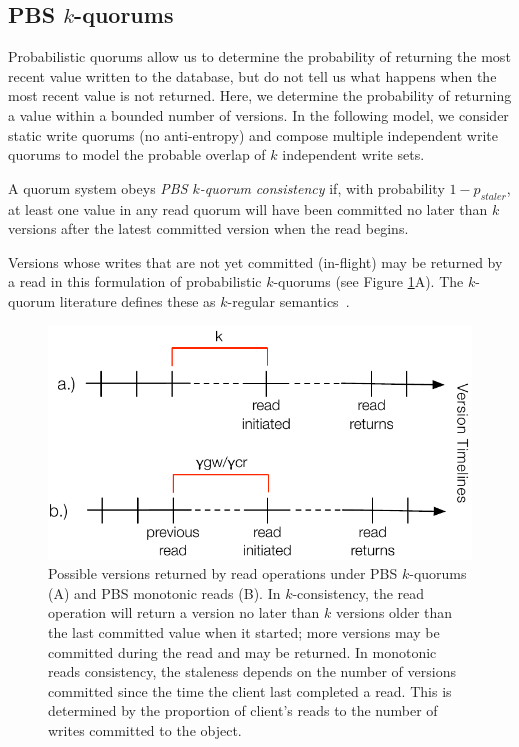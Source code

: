 \documentclass{vldb}
\begin{document}
\subsection{PBS $k$-quorums}

Probabilistic quorums allow us to determine the probability of
returning the most recent value written to the database, but do not
tell us what happens when the most recent value is not returned.
Here, we determine the probability of returning a value within a
bounded number of versions.  In the following model, we consider
static write quorums (no anti-entropy) and compose multiple
independent write quorums to model the probable overlap of $k$
independent write sets.
\begin{definition}
A quorum system obeys \textit{PBS $k$-quorum consistency} if, with
probability $1-p_{staler}$, at least one value in any read quorum will
have been committed no later than $k$ versions after the latest committed
version when the read begins.
\end{definition}
Versions whose writes that are not yet committed (in-flight) may be
returned by a read in this formulation of probabilistic $k$-quorums
(see Figure \ref{fig:timelines}A).  The $k$-quorum literature defines
these as $k$-regular semantics~\cite{nonstrict-availability}.

\begin{figure}
\centering
\includegraphics[width=\columnwidth]{figs/timelines.pdf}
\caption{Possible versions returned by read operations under
  PBS $k$-quorums (A) and PBS monotonic reads (B). In
  $k$-consistency, the read operation will return a version no later
  than $k$ versions older than the last committed value when it
  started; more versions may be committed during the read and may be
  returned.  In monotonic reads consistency, the staleness depends on
  the number of versions committed since the time the client last
  completed a read.  This is determined by the proportion of client's
  reads to the number of writes committed to the object.}
\label{fig:timelines}
\end{figure}
\end{document}
